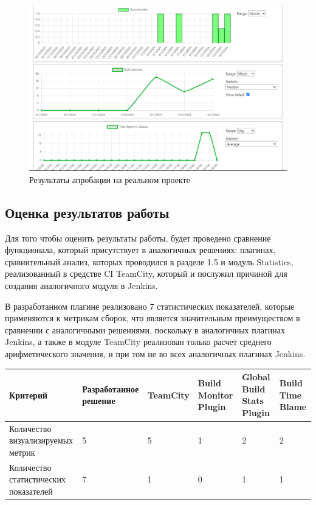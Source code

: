  \begin{figure}[ht!] 
	\center
	\includegraphics [scale=0.47] {my_folder/images//resultAprob}
	\caption{Результаты апробации на реальном проекте} 
	\label{fig:resultAprob}  
\end{figure}

 \subsection{Оценка результатов работы}
 
 Для того чтобы оценить результаты работы, будет проведено сравнение функционала, который присутствует в аналогичных решениях: плагинах, сравнительный анализ, которых проводился в разделе 1.5 и модуль Statistics, реализованный в средстве CI TeamCity, который и послужил причиной для создания аналогичного модуля в Jenkins.
 
 
 


В разработанном плагине реализовано 7 статистических показателей, которые применяются к метрикам сборок, что является значительным преимуществом в сравнении с аналогичными решениями, поскольку в аналогичных плагинах Jenkins, а также в модуле TeamCity реализован только расчет среднего арифметического значения, и при том не во всех аналогичных плагинах Jenkins.

 \begin{table}
    \centering
    \begin{tabular}{|p{3cm}|p{3cm}|p{2cm}|p{2cm}|p{2cm}|p{2cm}|}
    \hline
        Критерий & Разработанное решение & TeamCity & Build Monitor Plugin & Global Build Stats Plugin  & Build Time Blame \\ \hline
        Количество визуализируемых метрик & 5 & 5 & 1 & 2 &2 \\ \hline
        Количество статистических показателей & 7 & 1 & 0 & 1 &1\\ \hline


    \end{tabular}
\end{table}

